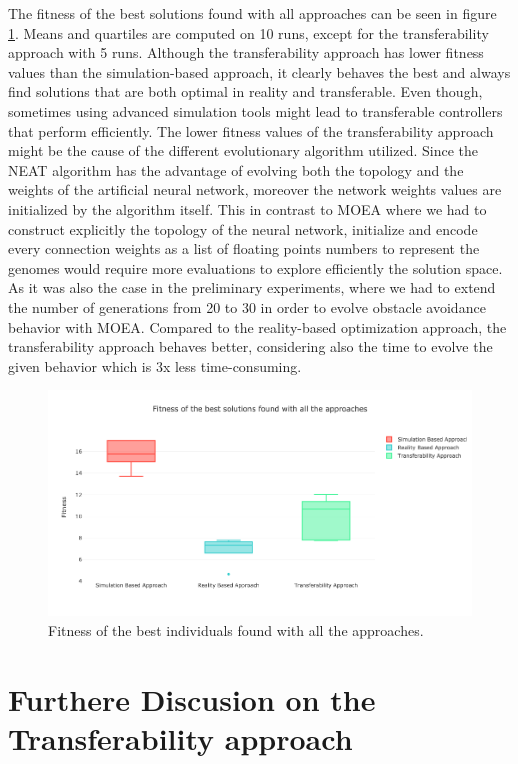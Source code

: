 The fitness of the best solutions found with all approaches can be seen in figure \ref{fig:fitness_comparison}. Means and quartiles are computed on 10 runs, except for the transferability approach with 5 runs. Although the transferability approach has lower fitness values than the simulation-based approach, it clearly behaves the best and always find solutions that are both optimal in reality and transferable. Even though, sometimes using advanced simulation tools might lead to transferable controllers that perform efficiently. The lower fitness values of the transferability approach might be the cause of the different evolutionary algorithm utilized. Since the NEAT algorithm has the advantage of evolving both the topology and the weights of the artificial neural network, moreover the network weights values are initialized by the algorithm itself. This in contrast to MOEA where we had to construct explicitly the topology of the neural network, initialize and encode every connection weights as a list of floating points numbers to represent the genomes would require more evaluations to explore efficiently the solution space. As it was also the case in the preliminary experiments, where we had to extend the number of generations from 20 to 30 in order to evolve obstacle avoidance behavior with MOEA. Compared to the reality-based optimization approach, the transferability approach behaves better, considering also the time to evolve the given behavior which is 3x less time-consuming.

\begin{figure}[H]
	\centering
  	\includegraphics[width=14cm]{include/images/fitness_comparison.PNG}
  	\caption{Fitness of the best individuals found with all the approaches.}
  	\label{fig:fitness_comparison}
\end{figure}

\section{Furthere Discusion on the Transferability approach}

